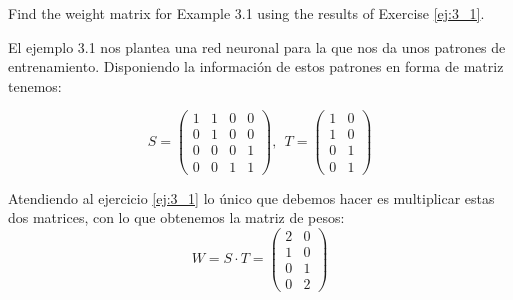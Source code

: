 \begin{problem}[3]
Find the weight matrix for Example 3.1 using the results of Exercise \ref{ej:3_1}.
\solution


El ejemplo 3.1 nos plantea una red neuronal para la que nos da unos patrones de entrenamiento. Disponiendo la información de estos patrones en forma de matriz tenemos:

\[S = \left( \begin{array}{cccc}
1 & 1 & 0 & 0\\
0 & 1 & 0 & 0\\
0 & 0 & 0 & 1\\
0 & 0 & 1 & 1
\end{array}\right), \ \ T = \left( \begin{array}{cc}
1 & 0 \\
1 & 0 \\
0 & 1 \\
0 & 1
\end{array}\right)\]

Atendiendo al ejercicio \ref{ej:3_1} lo único que debemos hacer es multiplicar estas dos matrices, con lo que obtenemos la matriz de pesos:
\[W = S\cdot T = \left( \begin{array}{cc}
2 & 0 \\
1 & 0 \\
0 & 1 \\
0 & 2
\end{array}\right)\]

\end{problem}

